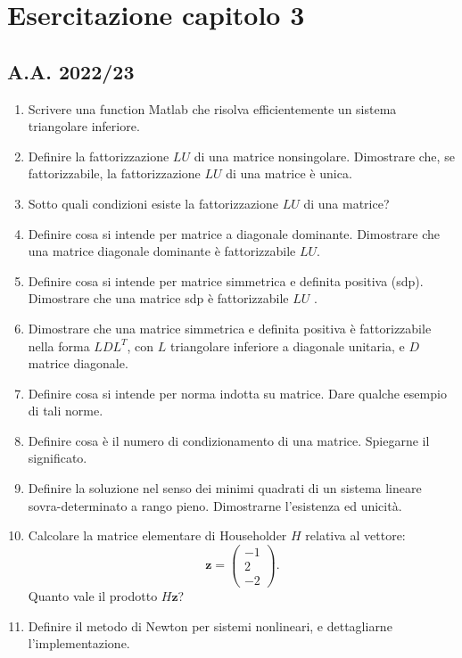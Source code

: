 \section{Esercitazione capitolo 3}
\subsection{A.A. 2022/23}
\begin{enumerate}
    \item  Scrivere una function Matlab che risolva efficientemente un sistema triangolare inferiore.
    \item Definire la fattorizzazione $LU$ di una matrice nonsingolare. Dimostrare che, se fattorizzabile, la fattorizzazione $LU$ di una matrice è unica.
    \item  Sotto quali condizioni esiste la fattorizzazione $LU$ di una matrice?
    \item Definire cosa si intende per matrice a diagonale dominante. Dimostrare che una matrice diagonale dominante è fattorizzabile $LU$.
    \item  Definire cosa si intende per matrice simmetrica e definita positiva (sdp). Dimostrare che una matrice sdp è fattorizzabile $LU$ .
    \item Dimostrare che una matrice simmetrica e definita positiva è fattorizzabile nella forma $LDL^T$, con $L$ triangolare inferiore a diagonale unitaria, e $D$ matrice diagonale.
    \item  Definire cosa si intende per norma indotta su matrice. Dare qualche esempio di tali norme.
    \item  Definire cosa è il numero di condizionamento di una matrice. Spiegarne il significato.
    \item Definire la soluzione nel senso dei minimi quadrati di un sistema lineare sovra-determinato a rango pieno. Dimostrarne l’esistenza ed unicità.
    \item Calcolare la matrice elementare di Householder $H$ relativa al vettore: 
    \begin{equation*}
       \boldsymbol z = \begin{pmatrix}
        -1\\
        2\\
        -2
    \end{pmatrix}.
    \end{equation*}
    Quanto vale il prodotto $H\boldsymbol z$?
    \item Definire il metodo di Newton per sistemi nonlineari, e dettagliarne l’implementazione.
\end{enumerate}

